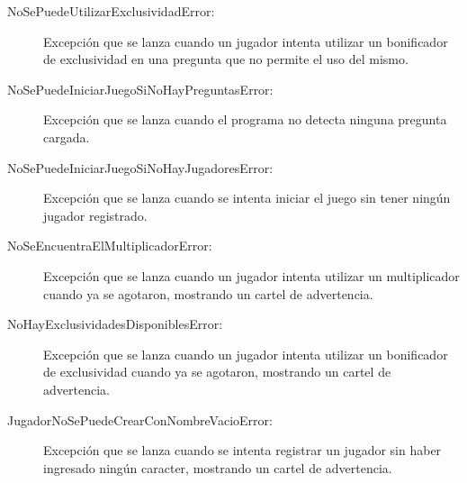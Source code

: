 \documentclass[titlepage,a4paper]{article}
\begin{document}
\begin{description}
\item[NoSePuedeUtilizarExclusividadError:] Excepción que se lanza cuando un jugador intenta utilizar un bonificador de exclusividad en una pregunta que no permite el uso del mismo.

\end{description}

\begin{description}
\item[NoSePuedeIniciarJuegoSiNoHayPreguntasError:] Excepción que se lanza cuando el programa no detecta ninguna pregunta cargada.

\end{description}

\begin{description}
\item[NoSePuedeIniciarJuegoSiNoHayJugadoresError:] Excepción que se lanza cuando se intenta iniciar el juego sin tener ningún jugador registrado.

\end{description}

\begin{description}
\item[NoSeEncuentraElMultiplicadorError:] Excepción que se lanza cuando un jugador intenta utilizar un multiplicador cuando ya se agotaron, mostrando un cartel de advertencia.

\end{description}

\begin{description}
\item[NoHayExclusividadesDisponiblesError:] Excepción que se lanza cuando un jugador intenta utilizar un bonificador de exclusividad cuando ya se agotaron, mostrando un cartel de advertencia.

\end{description}

\begin{description}
\item[JugadorNoSePuedeCrearConNombreVacioError:] Excepción que se lanza cuando se intenta registrar un jugador sin haber ingresado ningún caracter, mostrando un cartel de advertencia.

\end{description}
\end{document}
